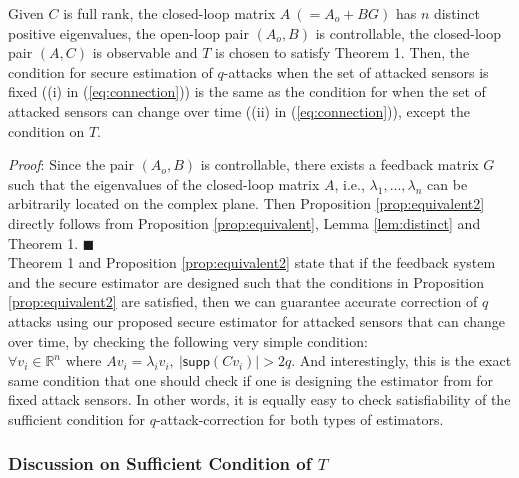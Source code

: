 \documentclass[../../thesis.tex]{subfiles}
\begin{document}
\begin{proposition}\label{prop:equivalent2}
Given $C$ is full rank, the closed-loop matrix $A~(=A_o+BG)$ has $n$ distinct positive eigenvalues, the open-loop pair $(A_o,B)$ is controllable, the closed-loop pair $(A,C)$ is observable and $T$ is chosen to satisfy Theorem 1. Then, the condition for secure estimation of $q$-attacks when the set of attacked sensors is fixed ((i) in (\ref{eq:connection})) is the same as the condition for when the set of attacked sensors can change over time ((ii) in (\ref{eq:connection})), except the condition on $T$.
\end{proposition}

\textit{Proof}:
Since the pair $(A_o,B)$ is controllable, there exists a feedback matrix $G$ such that the eigenvalues of the closed-loop matrix $A$, i.e., $\lambda_1, ..., \lambda_n$ can be arbitrarily located on the complex plane. Then Proposition \ref{prop:equivalent2} directly follows from Proposition \ref{prop:equivalent}, Lemma \ref{lem:distinct} and Theorem 1. \hfill$\blacksquare$\\


Theorem 1 and Proposition \ref{prop:equivalent2} state that if the feedback system and the secure estimator are designed such that the conditions in Proposition \ref{prop:equivalent2} are satisfied, then we can guarantee accurate correction of $q$ attacks using our proposed secure estimator for attacked sensors that can change over time, by checking the following very simple condition:
$ %
\forall v_i \in \mathbb{R}^n \text{ where } Av_i =\lambda_i v_i, ~ \lvert \textsf{supp}(Cv_i) \rvert > 2q.  \nonumber
$ %
And interestingly, this is the exact same condition that one should check if one is designing the estimator from \cite{Fawzi:2014} for fixed attack sensors. In other words, it is equally easy to check satisfiability of the sufficient condition for $q$-attack-correction for both types of estimators.


\subsubsection{Discussion on Sufficient Condition of $T$}
\end{document}
